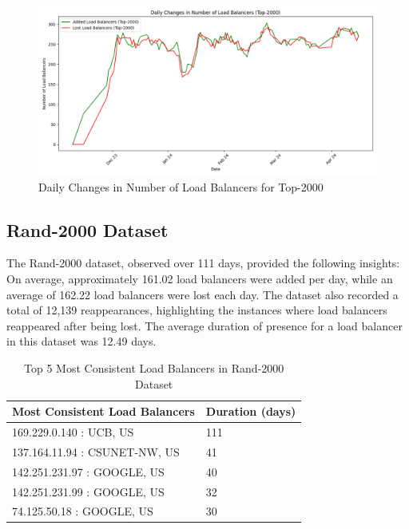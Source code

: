 \documentclass[12pt]{cwru_thesis}
\begin{document}
\begin{figure}[h!]
    \centering
    \includegraphics[width=\linewidth]{figures/load_balancer_changes_Top-2000.png}
    \caption{Daily Changes in Number of Load Balancers for Top-2000}
    \label{fig:top2000_changes}
\end{figure}

\subsection{Rand-2000 Dataset}

The Rand-2000 dataset, observed over 111 days, provided the following insights: On average, approximately 161.02 load balancers were added per day, while an average of 162.22 load balancers were lost each day. The dataset also recorded a total of 12,139 reappearances, highlighting the instances where load balancers reappeared after being lost. The average duration of presence for a load balancer in this dataset was 12.49 days.

\begin{table}[h!]
    \centering
    \begin{tabular}{|l|l|}
        \hline
        \textbf{Most Consistent Load Balancers} & \textbf{Duration (days)} \\ \hline
        169.229.0.140 : UCB, US & 111 \\ \hline
        137.164.11.94 : CSUNET-NW, US & 41 \\ \hline
        142.251.231.97 : GOOGLE, US & 40 \\ \hline
        142.251.231.99 : GOOGLE, US & 32 \\ \hline
        74.125.50.18 : GOOGLE, US & 30 \\ \hline
    \end{tabular}
    \caption{Top 5 Most Consistent Load Balancers in Rand-2000 Dataset}
\end{table}
\end{document}
